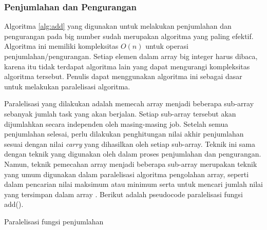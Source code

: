 \subsubsection{Penjumlahan dan Pengurangan}\label{sec:add_sub_parallel}
Algoritma \ref{alg:add} yang digunakan untuk melakukan penjumlahan dan pengurangan pada big number sudah merupakan algoritma yang paling efektif. Algoritma ini memiliki kompleksitas $O(n)$ untuk operasi penjumlahan/pengurangan. Setiap elemen dalam array big integer harus dibaca, karena itu tidak terdapat algoritma lain yang dapat mengurangi kompleksitas algoritma tersebut. Penulis dapat menggunakan algoritma ini sebagai dasar untuk melakukan paralelisasi algoritma.


Paralelisasi yang dilakukan adalah memecah array menjadi beberapa sub-array sebanyak jumlah task yang akan berjalan. Setiap sub-array tersebut akan dijumlahkan secara independen oleh masing-masing job. Setelah semua penjumlahan selesai, perlu dilakukan penghitungan nilai akhir penjumlahan sesuai dengan nilai \textit{carry} yang dihasilkan oleh setiap sub-array. Teknik ini sama dengan teknik yang digunakan oleh \citet{gpu_bignum} dalam proses penjumlahan dan pengurangan. Namun, teknik pemecahan array menjadi beberapa sub-array merupakan teknik yang umum digunakan dalam paralelisasi algoritma pengolahan array, seperti dalam pencarian nilai maksimum atau minimum serta untuk mencari jumlah nilai yang tersimpan dalam array \citep{intro_parallel}. Berikut adalah pseudocode paralelisasi fungsi add().

\begin{algorithm}
  \caption{Paralelisasi fungsi penjumlahan}
  \label{alg:parallel_add}
  \begin{algorithmic}[1]
    \Statex
          \State {}
      \EndFor
      \State {}
    \EndFunction
  \end{algorithmic}
\end{algorithm}

